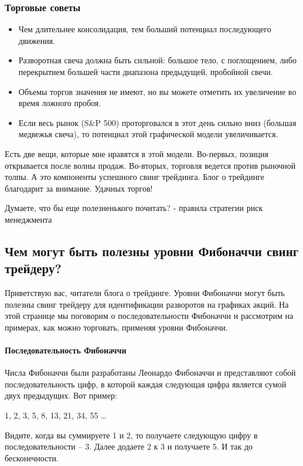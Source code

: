 \documentclass{book}
\begin{document}
\subsubsection{Торговые советы}

\begin{itemize}
\item     Чем длительнее консолидация, тем больший потенциал последующего движения.
\item     Разворотная свеча должна быть сильной: большое тело, с поглощением, либо перекрытием большей части диапазона предыдущей, пробойной свечи.
\item     Объемы торгов значения не имеют, но вы можете отметить их увеличение во время ложного пробоя.
\item     Если весь рынок (S\&P 500) проторговался в этот день сильно вниз (большая медвежья свеча), то потенциал этой графической модели увеличивается.
\end{itemize}

Есть две вещи, которые мне нравятся в этой модели. Во-первых, позиция открывается после волны продаж. Во-вторых, торговля ведется против рыночной толпы. А это компоненты успешного свинг трейдинга. Блог о трейдинге благодарит за внимание. Удачных торгов!


Думаете, что бы еще полезненького почитать? - правила стратегии риск менеджмента

\subsection{Чем могут быть полезны уровни Фибоначчи свинг трейдеру?}

Приветствую вас, читатели блога о трейдинге. Уровни Фибоначчи могут быть полезны свинг трейдеру для идентификации разворотов на графиках акций. На этой странице мы поговорим о последовательности Фибоначчи и рассмотрим на примерах, как можно торговать, применяя уровни Фибоначчи.

\paragraph{Последовательность Фибоначчи}

Числа Фибоначчи были разработаны Леонардо Фибоначчи и представляют собой последовательность цифр, в которой каждая следующая цифра является сумой двух предыдущих. Вот пример:

1, 2, 3, 5, 8, 13, 21, 34, 55 …

Видите, когда вы суммируете 1 и 2, то получаете следующую цифру в последовательности – 3. Далее додаете 2 к 3 и получаете 5. И так до бесконечности.
\end{document}
